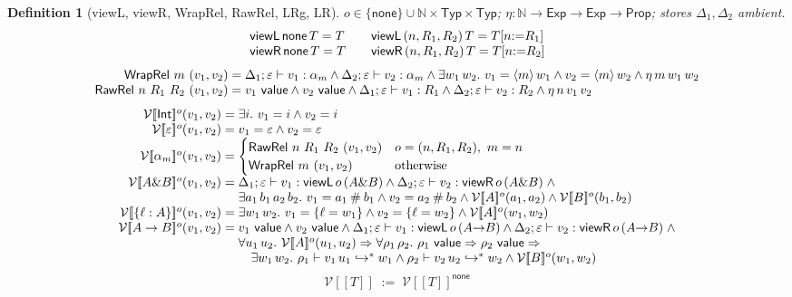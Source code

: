\documentclass[10pt]{article}
\newtheorem{definition}[theorem]{Definition}
\newcommand{\Int}{\mathsf{Int}}
\newcommand{\tp}{\varepsilon}
\newcommand{\bra}[1]{\alpha_{#1}}
\newcommand{\mrg}{\mathbin{\#}}
\newcommand{\subs}[3]{#1[#2{:=}#3]}
\newcommand{\wrp}[2]{\langle #1\rangle\,#2}
\newcommand{\Val}{\mathsf{value}}
\newcommand{\msteps}[3]{#1 \vdash #2 \hookrightarrow^{*} #3}
\newcommand{\hast}[4]{#1; #2 \vdash #3 : #4}
\newcommand{\sT}[1]{[\![#1]\!]}
\newcommand{\LRg}[2]{\mathcal{V}\sT{#2}^{#1}}
\newcommand{\LRc}[1]{\mathcal{V}\sT{#1}}
\begin{document}
\begin{definition}[\textsf{viewL}, \textsf{viewR}, \textsf{WrapRel}, \textsf{RawRel}, \textsf{LRg}, \textsf{LR}]
$o \in \{\mathsf{none}\} \cup \mathbb{N}\times\mathsf{Typ}\times\mathsf{Typ}$; \quad
$\eta : \mathbb{N} \to \mathsf{Exp} \to \mathsf{Exp} \to \mathsf{Prop}$; \quad stores $\Delta_1, \Delta_2$ ambient.
\[
\begin{array}{l@{\qquad}l}
\mathsf{viewL}\,\mathsf{none}\,T = T & \mathsf{viewL}\,(n,R_1,R_2)\,T = \subs{T}{n}{R_1} \\
\mathsf{viewR}\,\mathsf{none}\,T = T & \mathsf{viewR}\,(n,R_1,R_2)\,T = \subs{T}{n}{R_2}
\end{array}
\]
\[
\begin{array}{r@{\;}c@{\;}l}
\mathsf{WrapRel}\ m\ (v_1,v_2) &=& \hast{\Delta_1}{\tp}{v_1}{\bra{m}} \wedge \hast{\Delta_2}{\tp}{v_2}{\bra{m}} \wedge
  \exists w_1\,w_2.\ v_1 = \wrp{m}{w_1} \wedge v_2 = \wrp{m}{w_2} \wedge \eta\,m\,w_1\,w_2 \\
\mathsf{RawRel}\ n\ R_1\ R_2\ (v_1,v_2) &=& v_1\ \Val \wedge v_2\ \Val \wedge
  \hast{\Delta_1}{\tp}{v_1}{R_1} \wedge \hast{\Delta_2}{\tp}{v_2}{R_2} \wedge \eta\,n\,v_1\,v_2
\end{array}
\]
\[
\begin{array}{r@{\;}c@{\;}l}
\LRg{o}{\Int}(v_1,v_2) &=& \exists i.\ v_1 = i \wedge v_2 = i \\
\LRg{o}{\tp}(v_1,v_2) &=& v_1 = \tp \wedge v_2 = \tp \\
\LRg{o}{\bra{m}}(v_1,v_2) &=& \begin{cases}
    \mathsf{RawRel}\ n\ R_1\ R_2\ (v_1,v_2) & o = (n,R_1,R_2),\ m = n \\
    \mathsf{WrapRel}\ m\ (v_1,v_2) & \text{otherwise}
  \end{cases} \\
\LRg{o}{A \& B}(v_1,v_2) &=& \hast{\Delta_1}{\tp}{v_1}{\mathsf{viewL}\,o\,(A\&B)} \wedge \hast{\Delta_2}{\tp}{v_2}{\mathsf{viewR}\,o\,(A\&B)} \;\wedge \\
  && \exists a_1\,b_1\,a_2\,b_2.\ v_1 = a_1 \mrg b_1 \wedge v_2 = a_2 \mrg b_2 \wedge \LRg{o}{A}(a_1,a_2) \wedge \LRg{o}{B}(b_1,b_2) \\
\LRg{o}{\{\ell:A\}}(v_1,v_2) &=& \exists w_1\,w_2.\ v_1 = \{\ell = w_1\} \wedge v_2 = \{\ell = w_2\} \wedge \LRg{o}{A}(w_1,w_2) \\
\LRg{o}{A \to B}(v_1,v_2) &=& v_1\ \Val \wedge v_2\ \Val \wedge
  \hast{\Delta_1}{\tp}{v_1}{\mathsf{viewL}\,o\,(A{\to}B)} \wedge \hast{\Delta_2}{\tp}{v_2}{\mathsf{viewR}\,o\,(A{\to}B)} \;\wedge \\
  && \forall u_1\,u_2.\ \LRg{o}{A}(u_1,u_2) \Rightarrow \forall \rho_1\,\rho_2.\ \rho_1\ \Val \Rightarrow \rho_2\ \Val \Rightarrow \\
  && \quad \exists w_1\,w_2.\ \msteps{\rho_1}{v_1\,u_1}{w_1} \wedge \msteps{\rho_2}{v_2\,u_2}{w_2} \wedge \LRg{o}{B}(w_1,w_2)
\end{array}
\]
\[
\LRc{T} \;:=\; \LRg{\mathsf{none}}{T}
\]
\end{definition}
\end{document}
